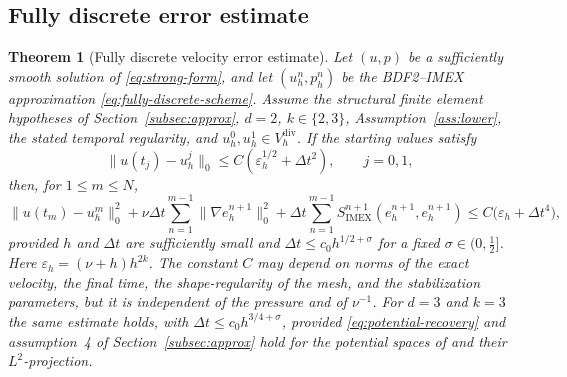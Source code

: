 \documentclass[11pt]{article}
\newtheorem{theorem}{Theorem}
\theoremstyle{remark}\newtheorem{remark}{Remark}
\newcommand{\Vdivh}{V_h^{\mathrm{div}}}
\newcommand{\Simex}{S_{\mathrm{IMEX}}}
\theoremstyle{plain}
\newcommand{\new}[1]{{\color{blue}#1}}
\begin{document}
\subsection{Fully discrete error estimate}
\begin{theorem}[Fully discrete velocity error estimate]\label{thm:velocity}
Let $(u,p)$ be a sufficiently smooth solution of \eqref{eq:strong-form}, and let $(u_h^n,p_h^n)$ be the BDF2--IMEX approximation \eqref{eq:fully-discrete-scheme}. Assume the structural finite element hypotheses of Section~\ref{subsec:approx}, \new{$d=2$, $k\in\{2,3\}$}, Assumption~\ref{ass:lower}, the stated temporal regularity, and $u_h^0,u_h^1\in\Vdivh$. If the starting values satisfy
\[\|u(t_j)-u_h^j\|_0\le C(\varepsilon_h^{1/2}+\Delta t^2),\qquad j=0,1,\]
then, for $1\le m\le N$,
\[\|u(t_m)-u_h^m\|_0^2+\nu\Delta t\sum_{n=1}^{m-1}\|\nabla e_h^{n+1}\|_0^2+\Delta t\sum_{n=1}^{m-1}\Simex^{n+1}(e_h^{n+1},e_h^{n+1})\le C\big(\varepsilon_h+\Delta t^4\big),\]
provided $h$ and $\Delta t$ are sufficiently small and \new{$\Delta t\le c_0h^{1/2+\sigma}$ for a fixed $\sigma\in(0,\frac12]$}. Here \new{$\varepsilon_h=(\nu+h)h^{2k}$}. The constant $C$ may depend on norms of the exact velocity, the final time, the shape-regularity of the mesh, and the stabilization parameters, but it is independent of the pressure and of $\nu^{-1}$. \new{For $d=3$ and $k=3$ the same estimate holds, with $\Delta t\le c_0h^{3/4+\sigma}$, provided \eqref{eq:potential-recovery} and assumption~4 of Section~\ref{subsec:approx} hold for the potential spaces of \cite{FGN20} and their $L^2$-projection.}
\end{theorem}
\end{document}
